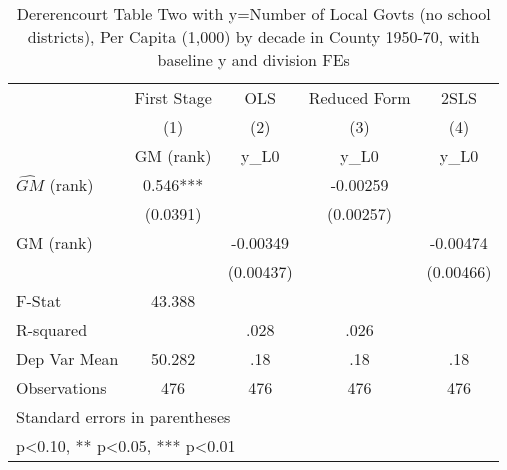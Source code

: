 \begin{table}[htbp]\centering
\def\sym#1{\ifmmode^{#1}\else\(^{#1}\)\fi}
\caption{Dererencourt Table Two with y=Number of Local Govts (no school districts), Per Capita (1,000) by decade in County 1950-70, with baseline y and division FEs}
\begin{tabular}{l*{4}{c}}
\toprule
                    & First Stage   &         OLS   &Reduced Form   &        2SLS   \\
                    &\multicolumn{1}{c}{(1)}&\multicolumn{1}{c}{(2)}&\multicolumn{1}{c}{(3)}&\multicolumn{1}{c}{(4)}\\
                    &\multicolumn{1}{c}{GM  (rank)}&\multicolumn{1}{c}{y\_L0}&\multicolumn{1}{c}{y\_L0}&\multicolumn{1}{c}{y\_L0}\\
\midrule
$\hat{GM}$ (rank)   &       0.546***&               &    -0.00259   &               \\
                    &    (0.0391)   &               &   (0.00257)   &               \\
\addlinespace
GM  (rank)          &               &    -0.00349   &               &    -0.00474   \\
                    &               &   (0.00437)   &               &   (0.00466)   \\
\midrule
F-Stat              &      43.388   &               &               &               \\
R-squared           &               &        .028   &        .026   &               \\
Dep Var Mean        &      50.282   &         .18   &         .18   &         .18   \\
Observations        &         476   &         476   &         476   &         476   \\
\bottomrule
\multicolumn{5}{l}{\footnotesize Standard errors in parentheses}\\
\multicolumn{5}{l}{\footnotesize * p<0.10, ** p<0.05, *** p<0.01}\\
\end{tabular}
\end{table}
